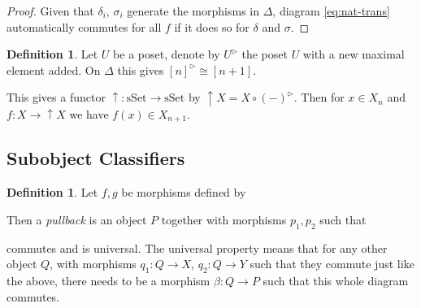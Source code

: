\documentclass[12pt]{article}
\theoremstyle{definition}
\newtheorem{definition}[theorem]{Definition}
\newcommand{\1}{\mathbbm{1}}
\begin{document}
\begin{proof}
    Given that $\delta_i$, $\sigma_i$ generate the morphisms in $\Delta$, diagram \ref{eq:nat-trans} automatically commutes for all $f$ if it does so for $\delta$ and $\sigma$.
\end{proof}

\begin{definition}
    Let $U$ be a poset, denote by $U^{\rhd}$ the poset $U$ with a new maximal element added. On $\Delta$ this gives $[n]^{\rhd} \cong [n+1]$. 

    This gives a functor $\uparrow: \mathrm{sSet}\to \mathrm{sSet}$ by $\uparrow X = X\circ (-)^{\rhd}$. Then for $x\in X_n$ and $f:X\to \uparrow X$ we have $f(x)\in X_{n+1}$.
\end{definition}

\subsection{Subobject Classifiers}
\begin{definition}
    Let $f, g$ be morphisms defined by
    \begin{center}
    \end{center}

    Then a \emph{pullback} is an object $P$ together with morphisms $p_1, p_2$ such that 
    \begin{center}
    \end{center}
    commutes and is universal. The universal property means that for any other object $Q$, with morphisms $q_1: Q\to X$, $q_2: Q\to Y$ such that they commute just like the above, there needs to be a morphism $\beta: Q\to P$ such that this whole diagram commutes. 

    \begin{center}
    \end{center}
\end{definition}
\end{document}
